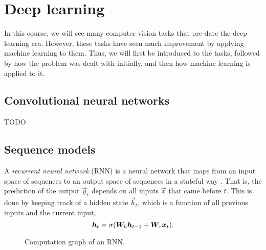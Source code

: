 \section{Deep learning}

In this course, we will see many computer vision tasks that pre-date the deep
learning era. However, these tasks have seen much improvement by applying
machine learning to them. Thus, we will first be introduced to the tasks,
followed by how the problem was dealt with initially, and then how machine
learning is applied to it.

\subsection{Convolutional neural networks}

TODO

\subsection{Sequence models}


A \textit{recurrent neural network} (RNN) is a neural network that maps from an
input space of sequences to an output space of sequences in a stateful way
\citep{rumelhart1985learning}. That is, the prediction of the output
$\vec{y}_t$ depends on all inputs $\vec{x}$ that came before $t$. This is done
by keeping track of a hidden state $\vec{h}_t$, which is a function of all
previous inputs and the current input, \[
    \bm{h}_t = \sigma(\bm{W}_h\bm{h}_{t-1}+\bm{W}_x\bm{x}_t).
\]

\begin{figure}
    \centering
    \caption{Computation graph of an RNN.}
    \label{fig:rnn}
\end{figure}

